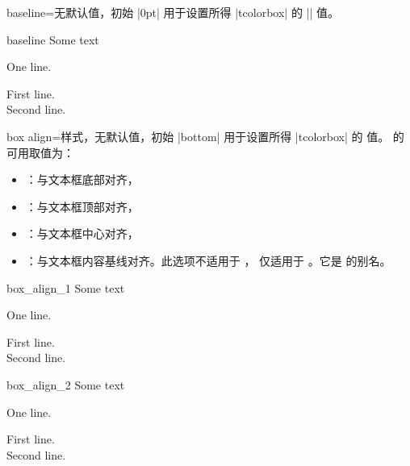 \clearpage

\begin{docTcbKey}{baseline}{=}{无默认值，初始 |0pt|}
  用于设置所得 |tcolorbox| 的 |\pgfsetbaseline| 值。
\begin{exdispExample}{baseline}
Some text\dotfill
\begin{tcolorbox}[baseline=3mm]
One line.
\end{tcolorbox}
\begin{tcolorbox}[baseline=3mm]
First line.\\Second line.
\end{tcolorbox}
\end{exdispExample}
\end{docTcbKey}


\begin{docTcbKey}[][doc new=2014-10-10]{box align}{=}{样式，无默认值，初始 |bottom|}
  用于设置所得 |tcolorbox| 的  值。
   的可用取值为：
  \begin{itemize}
  \item{}：与文本框底部对齐，
  \item{}：与文本框顶部对齐，
  \item{}：与文本框中心对齐，
  \item{}：与文本框内容基线对齐。此选项不适用于 ，
    仅适用于 。它是  的别名。
  \end{itemize}

\begin{exdispExample}{box_align_1}
Some text\dotfill
\begin{tcolorbox}[box align=bottom]
One line.
\end{tcolorbox}
\begin{tcolorbox}[box align=bottom]
First line.\\Second line.
\end{tcolorbox}
\end{exdispExample}

\begin{exdispExample}{box_align_2}
Some text\dotfill
\begin{tcolorbox}[box align=top]
One line.
\end{tcolorbox}
\begin{tcolorbox}[box align=top]
First line.\\Second line.
\end{tcolorbox}
\end{exdispExample}


\end{docTcbKey}
